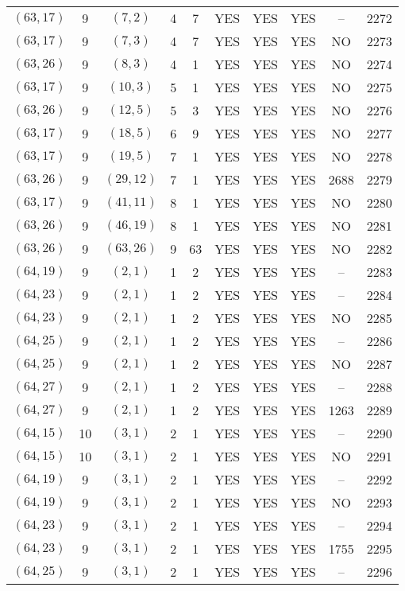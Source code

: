 \begin{longtable}{|c|c|c|c|c|c|c|c|c|c|}
$(63, 17)$ & 9 & $(7, 2)$ & 4 & 7 & YES & YES & YES & -- & 2272\\
$(63, 17)$ & 9 & $(7, 3)$ & 4 & 7 & YES & YES & YES & NO & 2273\\
$(63, 26)$ & 9 & $(8, 3)$ & 4 & 1 & YES & YES & YES & NO & 2274\\
$(63, 17)$ & 9 & $(10, 3)$ & 5 & 1 & YES & YES & YES & NO & 2275\\
$(63, 26)$ & 9 & $(12, 5)$ & 5 & 3 & YES & YES & YES & NO & 2276\\
$(63, 17)$ & 9 & $(18, 5)$ & 6 & 9 & YES & YES & YES & NO & 2277\\
$(63, 17)$ & 9 & $(19, 5)$ & 7 & 1 & YES & YES & YES & NO & 2278\\
$(63, 26)$ & 9 & $(29, 12)$ & 7 & 1 & YES & YES & YES & 2688 & 2279\\
$(63, 17)$ & 9 & $(41, 11)$ & 8 & 1 & YES & YES & YES & NO & 2280\\
$(63, 26)$ & 9 & $(46, 19)$ & 8 & 1 & YES & YES & YES & NO & 2281\\
$(63, 26)$ & 9 & $(63, 26)$ & 9 & 63 & YES & YES & YES & NO & 2282\\
$(64, 19)$ & 9 & $(2, 1)$ & 1 & 2 & YES & YES & YES & -- & 2283\\
$(64, 23)$ & 9 & $(2, 1)$ & 1 & 2 & YES & YES & YES & -- & 2284\\
$(64, 23)$ & 9 & $(2, 1)$ & 1 & 2 & YES & YES & YES & NO & 2285\\
$(64, 25)$ & 9 & $(2, 1)$ & 1 & 2 & YES & YES & YES & -- & 2286\\
$(64, 25)$ & 9 & $(2, 1)$ & 1 & 2 & YES & YES & YES & NO & 2287\\
$(64, 27)$ & 9 & $(2, 1)$ & 1 & 2 & YES & YES & YES & -- & 2288\\
$(64, 27)$ & 9 & $(2, 1)$ & 1 & 2 & YES & YES & YES & 1263 & 2289\\
$(64, 15)$ & 10 & $(3, 1)$ & 2 & 1 & YES & YES & YES & -- & 2290\\
$(64, 15)$ & 10 & $(3, 1)$ & 2 & 1 & YES & YES & YES & NO & 2291\\
$(64, 19)$ & 9 & $(3, 1)$ & 2 & 1 & YES & YES & YES & -- & 2292\\
$(64, 19)$ & 9 & $(3, 1)$ & 2 & 1 & YES & YES & YES & NO & 2293\\
$(64, 23)$ & 9 & $(3, 1)$ & 2 & 1 & YES & YES & YES & -- & 2294\\
$(64, 23)$ & 9 & $(3, 1)$ & 2 & 1 & YES & YES & YES & 1755 & 2295\\
$(64, 25)$ & 9 & $(3, 1)$ & 2 & 1 & YES & YES & YES & -- & 2296\\

\end{longtable}
